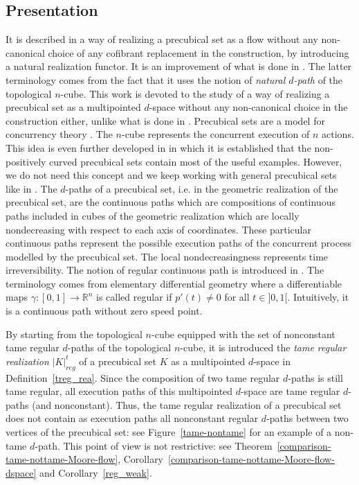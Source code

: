 \documentclass[a4paper,12pt]{amsart}
\theoremstyle{definition}
\begin{document}
\subsection*{Presentation}
It is described in \cite{NaturalRealization} a way of realizing a precubical set as a flow without any non-canonical choice of any cofibrant replacement in the construction, by introducing a natural realization functor. It is an improvement of what is done in \cite[Section~4]{realization}. The latter terminology comes from the fact that it uses the notion of \textit{natural $d$-path} of the topological $n$-cube. This work is devoted to the study of a way of realizing a precubical set as a multipointed $d$-space without any non-canonical choice in the construction either, unlike what is done in \cite[Section~5]{realization}. Precubical sets are a model for concurrency theory \cite{DAT_book}. The $n$-cube represents the concurrent execution of $n$ actions. This idea is even further developed in \cite{zbMATH07226006} in which it is established that the non-positively curved precubical sets contain most of the useful examples. However, we do not need this concept and we keep working with general precubical sets like in \cite{NaturalRealization}. The $d$-paths of a precubical set, i.e. in the geometric realization of the precubical set, are the continuous paths which are compositions of continuous paths included in cubes of the geometric realization which are locally nondecreasing with respect to each axis of coordinates. These particular continuous paths represent the possible execution paths of the concurrent process modelled by the precubical set. The local nondecreasingness represents time irreversibility. The notion of regular continuous path is introduced in \cite[Definition~1.1]{reparam}. The terminology comes from elementary differential geometry where a differentiable maps $\gamma:[0,1]\to \mathbb{R}^n$ is called regular if $p'(t)\neq 0$ for all $t\in ]0,1[$. Intuitively, it is a continuous path without zero speed point.

By starting from the topological $n$-cube equipped with the set of nonconstant tame regular $d$-paths of the topological $n$-cube, it is introduced the \textit{tame regular realization} $|K|^t_{reg}$ of a precubical set $K$ as a multipointed $d$-space in Definition~\ref{treg_rea}. Since the composition of two tame regular $d$-paths is still tame regular, all execution paths of this multipointed $d$-space are tame regular $d$-paths (and nonconstant). Thus, the tame regular realization of a precubical set does not contain as execution paths all nonconstant regular $d$-paths between two vertices of the precubical set: see Figure~\ref{tame-nontame} for an example of a non-tame $d$-path. This point of view is not restrictive: see Theorem~\ref{comparison-tame-nottame-Moore-flow}, Corollary~\ref{comparison-tame-nottame-Moore-flow-dspace} and Corollary~\ref{reg_weak}.
\end{document}
